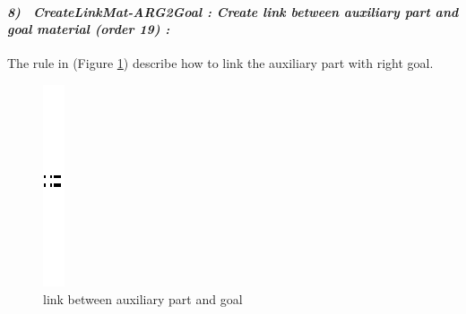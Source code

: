 \paragraph{\emph{8)~ CreateLinkMat-ARG2Goal : Create link between auxiliary part and goal material (order 19) :} }
 
 
The rule in (Figure \ref{fig:link between auxiliary part and goal}) describe 
how to link the auxiliary part with right goal. 
\vspace{1cm}
\begin{figure}[th]
\centering

	\quad{}\quad{}
		\includegraphics{ch3/img/sep}
	\quad{}\quad{}
 
\caption{\label{fig:link between auxiliary part and goal}link between auxiliary part and goal}
 
\end{figure}
\pagebreak
